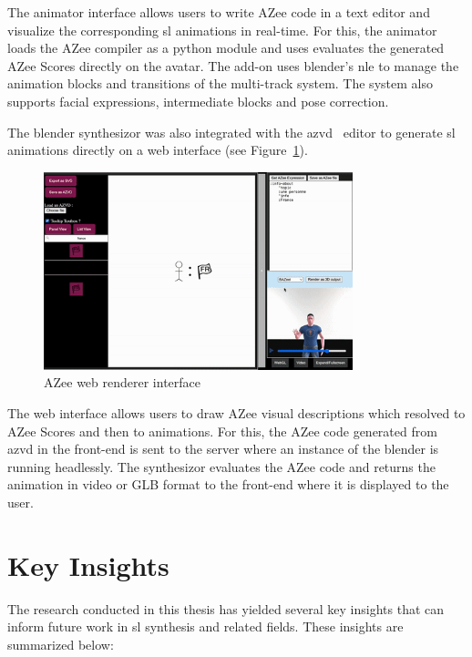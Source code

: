 \documentclass[../../main.tex]{subfiles}
\begin{document}
The animator interface allows users to write AZee code in a text editor and visualize the corresponding \gls{sl} animations in real-time. For this, the animator loads the AZee compiler as a python module and uses evaluates the generated AZee Scores directly on the avatar. The add-on uses blender's \gls{nle} to manage the animation blocks and transitions of the multi-track system. The system also supports facial expressions, intermediate blocks and pose correction.

The blender synthesizor was also integrated with the \gls{azvd}~\cite{filhol2024software} editor to generate \gls{sl} animations directly on a web interface (see Figure~\ref{fig:conclusion:azee_web_interface}).

\begin{figure}[ht]
    \centering
    \includegraphics[width=0.8\textwidth]{chapters/conclusion/images/azee_web_interface.png}
    \caption{AZee web renderer interface}
    \label{fig:conclusion:azee_web_interface}
\end{figure}

The web interface allows users to draw AZee visual descriptions which resolved to AZee Scores and then to animations. For this, the AZee code generated from \gls{azvd} in the front-end is sent to the server where an instance of the blender is running headlessly. The synthesizor evaluates the AZee code and returns the animation in video or GLB format to the front-end where it is displayed to the user.

\section{Key Insights}
\label{ch:conclusion:key_insights}

The research conducted in this thesis has yielded several key insights that can inform future work in \gls{sl} synthesis and related fields. These insights are summarized below:
\end{document}
